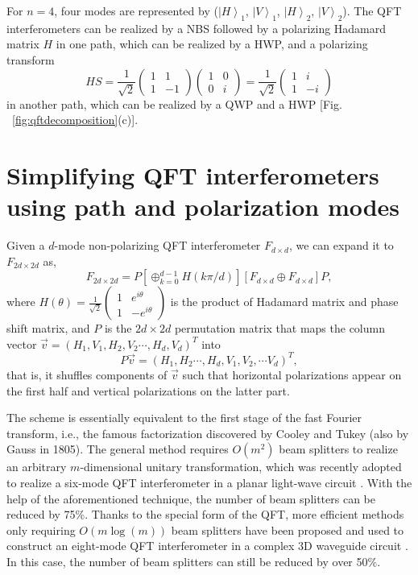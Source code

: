 \documentclass[aps,prl,twocolumn,superscriptaddress]{revtex4-1}
\begin{document}
For $n=4$, four modes are represented by (${\left| H \right\rangle _1}$, ${\left| V \right\rangle _1}$, ${\left| H \right\rangle _2}$, ${\left| V \right\rangle _2}$). The QFT interferometers can be realized by a NBS followed by a polarizing Hadamard matrix $ H $ in one path, which can be realized by a HWP, and a polarizing transform
\[HS = \frac{1}{{\sqrt 2 }}\left( {\begin{array}{*{20}{c}}
	1&1\\
	1&{ - 1}
	\end{array}} \right)\left( {\begin{array}{*{20}{c}}
	1&0\\
	0&i
	\end{array}} \right) = \frac{1}{{\sqrt 2 }}\left( {\begin{array}{*{20}{c}}
	1&i\\
	1&{ - i}
	\end{array}} \right)\]
in another path, which can be realized by a QWP and a HWP [Fig. ~\ref{fig:qftdecomposition}(c)].

\section{Simplifying QFT interferometers using path and polarization modes}
Given a $d$-mode non-polarizing QFT interferometer ${F_{d \times d}}$, we can expand it to ${F_{2d \times 2d}}$ as,
\[{F_{2d \times 2d}} = P[ \oplus _{k = 0}^{d - 1}H(k\pi /d)][{F_{d \times d}} \oplus {F_{d \times d}}]P,\]
where $H(\theta ) = \frac{1}{{\sqrt 2 }}\left( {\begin{array}{*{20}{c}}
	1&{{e^{i\theta }}}\\
	1&{ - {e^{i\theta }}}
	\end{array}} \right)$ is the product of Hadamard matrix and phase shift matrix, and $P$ is the $2d \times 2d$ permutation matrix that maps the column vector $\vec v  = {({H_1},{V_1},{H_2},{V_2} \cdots ,{H_d},{V_d})^T}$ into
\[P\vec v  = {({H_1},{H_2} \cdots ,{H_d},{V_1},{V_2}, \cdots {V_d})^T},\]
that is, it shuffles components of $\vec v $ such that horizontal polarizations appear on the first half and vertical polarizations on the latter part.

The scheme is essentially equivalent to the first stage of the fast Fourier transform, i.e., the famous factorization discovered by Cooley and Tukey \cite{cooley1965} (also by Gauss \cite{strang1993} in 1805). The general method \cite{reck1994,*clements2016} requires $O({m^2})$ beam splitters to realize an arbitrary $m$-dimensional unitary transformation, which was recently adopted to realize a six-mode QFT interferometer in a planar light-wave circuit \cite{carolan2015}. With the help of the aforementioned technique, the number of beam splitters can be reduced by 75\%. Thanks to the special form of the QFT, more efficient methods \cite{torma1996,*barak2007,*tabia2016} only requiring $O(m\log (m))$ beam splitters have been proposed and used to construct an eight-mode QFT interferometer in a complex 3D waveguide circuit \cite{crespi2016}. In this case, the number of beam splitters can still be reduced by over 50\%.
\end{document}
